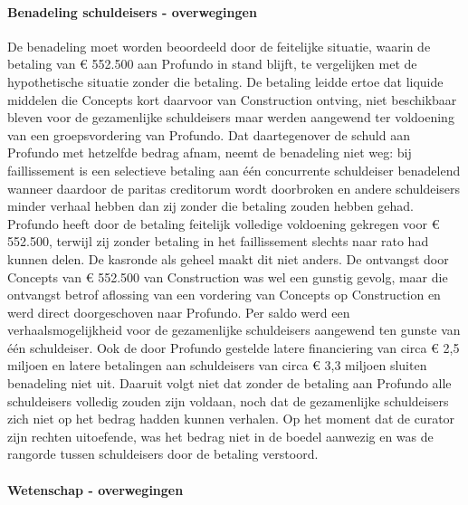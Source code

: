 \documentclass[
  dutch,
  a4paper,
]{article}
\begin{document}
\paragraph{Benadeling schuldeisers - overwegingen}\label{benadeling-schuldeisers---overwegingen-37}

De benadeling moet worden beoordeeld door de feitelijke situatie, waarin de betaling van € 552.500 aan Profundo in stand blijft, te vergelijken met de hypothetische situatie zonder die betaling. De betaling leidde ertoe dat liquide middelen die Concepts kort daarvoor van Construction ontving, niet beschikbaar bleven voor de gezamenlijke schuldeisers maar werden aangewend ter voldoening van een groepsvordering van Profundo. Dat daartegenover de schuld aan Profundo met hetzelfde bedrag afnam, neemt de benadeling niet weg: bij faillissement is een selectieve betaling aan één concurrente schuldeiser benadelend wanneer daardoor de paritas creditorum wordt doorbroken en andere schuldeisers minder verhaal hebben dan zij zonder die betaling zouden hebben gehad. Profundo heeft door de betaling feitelijk volledige voldoening gekregen voor € 552.500, terwijl zij zonder betaling in het faillissement slechts naar rato had kunnen delen. De kasronde als geheel maakt dit niet anders. De ontvangst door Concepts van € 552.500 van Construction was wel een gunstig gevolg, maar die ontvangst betrof aflossing van een vordering van Concepts op Construction en werd direct doorgeschoven naar Profundo. Per saldo werd een verhaalsmogelijkheid voor de gezamenlijke schuldeisers aangewend ten gunste van één schuldeiser. Ook de door Profundo gestelde latere financiering van circa € 2,5 miljoen en latere betalingen aan schuldeisers van circa € 3,3 miljoen sluiten benadeling niet uit. Daaruit volgt niet dat zonder de betaling aan Profundo alle schuldeisers volledig zouden zijn voldaan, noch dat de gezamenlijke schuldeisers zich niet op het bedrag hadden kunnen verhalen. Op het moment dat de curator zijn rechten uitoefende, was het bedrag niet in de boedel aanwezig en was de rangorde tussen schuldeisers door de betaling verstoord.

\paragraph{Wetenschap - overwegingen}\label{wetenschap---overwegingen-37}
\end{document}
